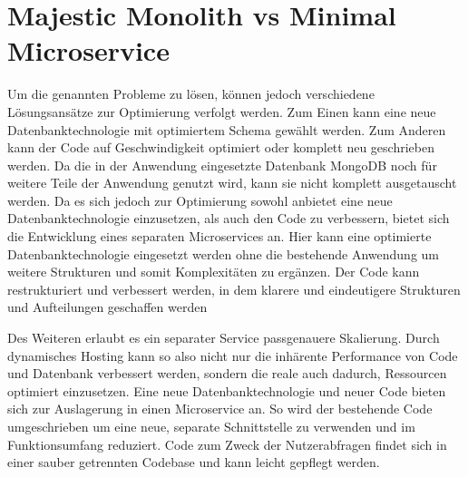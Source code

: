 \section{Majestic Monolith vs Minimal Microservice}
Um die genannten Probleme zu lösen, können jedoch verschiedene Lösungsansätze zur Optimierung verfolgt werden. Zum Einen kann eine neue Datenbanktechnologie mit optimiertem Schema gewählt werden. Zum Anderen kann der Code auf Geschwindigkeit optimiert oder komplett neu geschrieben werden.
Da die in der Anwendung eingesetzte Datenbank MongoDB noch für weitere Teile der Anwendung genutzt wird, kann sie nicht komplett ausgetauscht werden. Da es sich jedoch zur Optimierung sowohl anbietet eine neue Datenbanktechnologie einzusetzen, als auch den Code zu verbessern, bietet sich die Entwicklung eines separaten Microservices an. Hier kann eine optimierte Datenbanktechnologie eingesetzt werden ohne die bestehende Anwendung um weitere Strukturen und somit Komplexitäten zu ergänzen. Der Code kann restrukturiert und verbessert werden, in dem klarere und eindeutigere Strukturen und Aufteilungen geschaffen werden

Des Weiteren erlaubt es ein separater Service passgenauere Skalierung. Durch dynamisches Hosting kann so also nicht nur die inhärente Performance von Code und Datenbank verbessert werden, sondern die reale auch dadurch, Ressourcen optimiert einzusetzen.
Eine neue Datenbanktechnologie und neuer Code bieten sich zur Auslagerung in einen Microservice an. So wird der bestehende Code umgeschrieben um eine neue, separate Schnittstelle zu verwenden und im Funktionsumfang reduziert. Code zum Zweck der Nutzerabfragen findet sich in einer sauber getrennten Codebase und kann leicht gepflegt werden.


